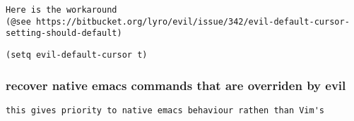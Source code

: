 \documentclass[11pt]{article}
\begin{document}
\begin{verbatim}
Here is the workaround
(@see https://bitbucket.org/lyro/evil/issue/342/evil-default-cursor-setting-should-default)
\end{verbatim}
\begin{verbatim}
(setq evil-default-cursor t)
\end{verbatim}



\subsubsection*{recover native emacs commands that are overriden by evil}
\label{sec:orgc9c5024}
\begin{verbatim}
this gives priority to native emacs behaviour rathen than Vim's
\end{verbatim}
\end{document}
